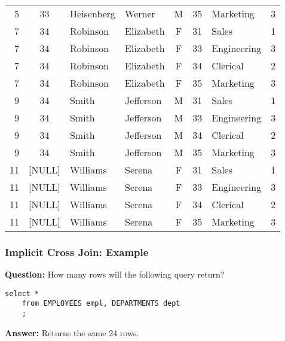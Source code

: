 \documentclass{beamer}
\begin{document}
\begin{frame}
\begin{center}
{\begin{tabulary}{\textwidth}{RCLLCRLC}
        5   & 33       & Heisenberg & Werner      & M      & 35       & Marketing   & 3           \\
        7   & 34       & Robinson   & Elizabeth   & F      & 31       & Sales       & 1           \\
        7   & 34       & Robinson   & Elizabeth   & F      & 33       & Engineering & 3           \\
        7   & 34       & Robinson   & Elizabeth   & F      & 34       & Clerical    & 2           \\
        7   & 34       & Robinson   & Elizabeth   & F      & 35       & Marketing   & 3           \\
        9   & 34       & Smith      & Jefferson   & M      & 31       & Sales       & 1           \\
        9   & 34       & Smith      & Jefferson   & M      & 33       & Engineering & 3           \\
        9   & 34       & Smith      & Jefferson   & M      & 34       & Clerical    & 2           \\
        9   & 34       & Smith      & Jefferson   & M      & 35       & Marketing   & 3           \\
        11  & [NULL]   & Williams   & Serena      & F      & 31       & Sales       & 1           \\
        11  & [NULL]   & Williams   & Serena      & F      & 33       & Engineering & 3           \\
        11  & [NULL]   & Williams   & Serena      & F      & 34       & Clerical    & 2           \\
        11  & [NULL]   & Williams   & Serena      & F      & 35       & Marketing   & 3           \\
      \end{tabulary}
    }
  \end{center}

\end{frame}

\begin{frame}[containsverbatim] %
  \frametitle{Implicit Cross Join: Example}
  
  \textbf{Question:} How many rows will the following query return?
  \bigskip

  \begin{lstlisting}[title={\tiny Source: https://github.com/Choens/sql-survival-guide/blob/master/sql/04-joins/cross-join.sql}]
    select *
    from EMPLOYEES empl, DEPARTMENTS dept
    ;
  \end{lstlisting}

  \bigskip
  \pause
  \textbf{Answer: } Returns the same 24 rows.
  
\end{frame}
\end{document}
